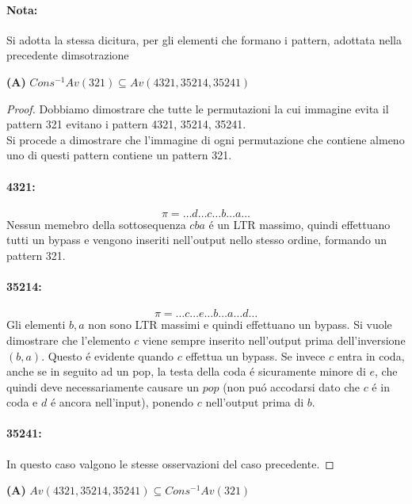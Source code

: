 \paragraph*{Nota:} Si adotta la stessa dicitura, per gli elementi che formano i pattern, adottata nella precedente dimsotrazione
\begin{center}
\textbf{(A)} $Cons^{-1}Av(321) \subseteq Av(4321, 35214, 35241)$
\end{center}
\begin{proof}
Dobbiamo dimostrare che tutte le permutazioni la cui immagine evita il pattern 321 evitano i pattern 4321, 35214, 35241.\\
Si procede a dimostrare che l'immagine di ogni permutazione che contiene almeno uno di questi pattern contiene un pattern 321.
\paragraph*{4321:} $$\pi=\dots{d}\dots{c}\dots{b}\dots{a}\dots$$
Nessun memebro della sottosequenza $cba$ \'e un LTR massimo, quindi effettuano tutti un bypass e vengono inseriti nell'output nello stesso ordine, formando un pattern 321.
\paragraph*{35214:}$$\pi=\dots{c}\dots{e}\dots{b}\dots{a}\dots{d}\dots$$
Gli elementi $b,a$ non sono LTR massimi e quindi effettuano un bypass. 
Si vuole dimostrare che l'elemento $c$ viene sempre inserito nell'output prima dell'inversione $(b,a)$. Questo \'e evidente quando $c$ effettua un bypass. 
Se invece $c$ entra in coda, anche se in seguito ad un pop, la testa della coda \'e sicuramente minore di $e$, 
che quindi deve necessariamente causare un $pop$ 
(non pu\'o accodarsi dato che $c$ \'e in coda e $d$ \'e ancora nell'input), 
ponendo $c$ nell'output prima di $b$.
\paragraph*{35241:} In questo caso valgono le stesse osservazioni del caso precedente.
\end{proof}
\begin{center}
\textbf{(A)} $Av(4321, 35214, 35241) \subseteq Cons^{-1}Av(321)$
\end{center}
